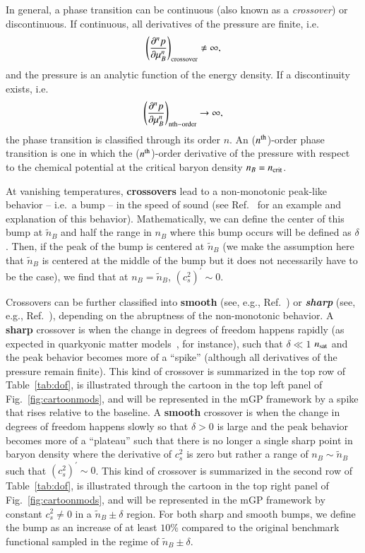 \documentclass[aps,prd,nofootinbib,tightenlines,notitlepage,floatfix,superscriptaddress,showkeys,twocolumn]{revtex4-1}
\begin{document}
In general, a phase transition can be continuous (also known as a \emph{crossover}) or discontinuous. If continuous, all derivatives of the pressure are finite, i.e. 
\begin{equation}
  \left(  \frac{\partial^n p}{\partial \mu_B^n}\right)_{\rm crossover} \neq  \infty,
\end{equation}
and the pressure is an analytic function of the energy density. If a discontinuity exists, i.e.
 \begin{equation}
  \left(  \frac{\partial^n p}{\partial \mu_B^n}\right)_{\rm nth-order}\rightarrow  \infty,
\end{equation}
the phase transition is classified through its order $n$. An ($n^{\rm th}$)-order phase transition is one in which the ($n^{\rm th}$)-order derivative of the pressure with respect to the chemical potential  at the critical baryon density $n_B=n_{\rm crit}$. 

At vanishing temperatures, {\bf crossovers} lead to a non-monotonic peak-like behavior -- i.e.~a bump -- in the speed of sound (see Ref.~\cite{McLerran:2018hbz} for an example and explanation of this behavior).  Mathematically, we can define the center of this bump at $\tilde{n}_B$ and half the range in $n_B$ where this bump occurs will be defined as $\delta$. Then, if the peak of the bump is centered at $\tilde{n}_B$ (we make the assumption here that $\tilde{n}_B$ is centered at the middle of the bump but it does not necessarily have to be the case), we find that at $n_B=\tilde{n}_B$, $\left(c_s^2\right)^\prime\sim 0$.

Crossovers can be further classified into  {\bf smooth} (see, e.g., Ref.~\cite{McLerran:2018hbz}) or \emph{\bf sharp} (see, e.g., Ref.~\cite{Fujimoto:2023ioi}), depending on the abruptness of the non-monotonic behavior. A {\bf sharp} crossover is when the change in degrees of freedom happens rapidly (as expected in quarkyonic matter models~\cite{McLerran:2018hbz,Fujimoto:2023ioi,Duarte:2023cki,Duarte:2021tsx,Duarte:2020kvi}, for instance), such that $\delta\ll 1$ $n_{\rm sat}$ and the peak behavior becomes more of a ``spike'' (although all derivatives of the pressure remain finite). This kind of  crossover is summarized in the top row of Table~\ref{tab:dof}, is illustrated through the cartoon in the top left panel of Fig.~\ref{fig:cartoonmods}, and will be represented in the mGP framework by a spike that rises relative to the baseline. A {\bf smooth} crossover is when the change in degrees of freedom happens slowly so that $\delta >0$  is large and the peak behavior becomes more of a ``plateau'' such that there is no longer a single sharp point in baryon density where the derivative of $c_s^2$ is zero but rather a range of $n_B\sim \tilde{n}_B$ such that $\left(c_s^2\right)^\prime\sim 0$. This kind of crossover is summarized in the second row of Table~\ref{tab:dof},  is illustrated through the cartoon in the top right panel of Fig.~\ref{fig:cartoonmods}, and will be represented in the mGP framework by constant $c_s^2 \neq 0$ in a $\tilde{n}_B\pm \delta$ region.  For both sharp and smooth bumps, we define the bump as an increase of at least $10\%$ compared to the original benchmark functional sampled in the regime of $\tilde{n}_B\pm \delta$. 
\end{document}
